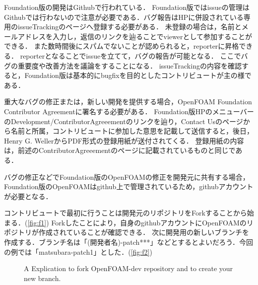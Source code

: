 \documentclass{ltjoc}
\begin{document}
Foundation版の開発はGithubで行われている． \cite{URL:GitHub-foundation}Foundation版ではissueの管理はGithubでは行わないので注意が必要である．バグ報告はHP\cite{URL:openfoam.org}に併設されている専用のissueTrackingのページへ登録する必要がある．
未登録の場合は，名前とメールアドレスを入力し，返信のリンクを辿ることでviewerとして参加することができる．
また数時間後にスパムでないことが認められると，reporterに昇格できる．
reporterとなることでissueを立てて，バグの報告が可能となる．
ここでバグの重要度や改善方法を議論をすることになる．
issueTrackingの内容を確認すると，Foundation版は基本的にbugfixを目的としたコントリビュートが主の様である．

重大なバグの修正または，新しい開発を提供する場合，OpenFOAM Foundation Contributor Agreementに署名する必要がある．
Foundation版HPのメニューバーのDevelopment/ContributorAgreeementのリンクを辿り，Contact Usのページから名前と所属，コントリビュートに参加した意思を記載して送信すると，後日，Henry G. WellerからPDF形式の登録用紙が送付されてくる．
登録用紙の内容は，前述のContributorAgreeementのページに記載されているものと同じである．

バグの修正などでFoundation版のOpenFOAMの修正を開発元に共有する場合，Foundation版のOpenFOAMはgithub上で管理されているため，githubアカウントが必要となる．

コントリビュートで最初に行うことは開発元のリポジトリをForkすることから始まる．(\autoref{fig:f1})
Forkしたことにより，自身のgithubアカウントにOpenFOAMのリポジトリが作成されていることが確認できる．
次に開発用の新しいブランチを作成する．ブランチ名は「(開発者名)-patch***」などとするとよいだろう．今回の例では「matsubara-patch1」とした．(\autoref{fig:f2})

\begin{figure}[htbp]
\centering
{}
\caption{A Explication to fork OpenFOAM-dev repository and to create your new branch.}
\label{fig:f1f2}
\end{figure}
\end{document}

